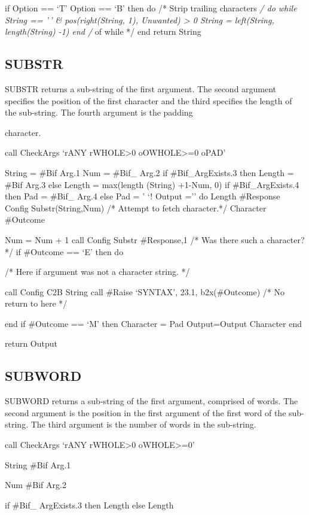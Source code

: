 if Option == `T' \textbar{} Option == `B' then do /* Strip trailing
characters \emph{/ do while String == '\,' \& pos(right(String, 1),
Unwanted) \textgreater{} 0 String = left(String, length(String) -1) end
/} of while */ end return String

\subsection{SUBSTR}\label{substr}

SUBSTR returns a sub-string of the first argument. The second argument
specifies the position of the first character and the third specifies
the length of the sub-string. The fourth argument is the padding

character.

call CheckArgs `rANY rWHOLE\textgreater0 oOWHOLE\textgreater=0 oPAD'

String = \#Bif Arg.1 Num = \#Bif\_ Arg.2 if \#Bif\_ArgExists.3 then
Length = \#Bif Arg.3 else Length = max(length (String) +1-Num, 0) if
\#Bif\_ArgExists.4 then Pad = \#Bif\_ Arg.4 else Pad = ' `! Output =''
do Length \#Response Config Substr(String,Num) /* Attempt to fetch
character.*/ Character \#Outcome

Num = Num + 1 call Config Substr \#Response,1 /* Was there such a
character? */ if \#Outcome == `E' then do

/* Here if argument was not a character string. */

call Config C2B String call \#Raise `SYNTAX', 23.1, b2x(\#Outcome) /* No
return to here */

end if \#Outcome == `M' then Character = Pad Output=Output \textbar{}
\textbar{} Character end

return Output

\subsection{SUBWORD}\label{subword}

SUBWORD returns a sub-string of the first argument, comprised of words.
The second argument is the position in the first argument of the first
word of the sub-string. The third argument is the number of words in the
sub-string.

call CheckArgs `rANY rWHOLE\textgreater0 oWHOLE\textgreater=0'

String \#Bif Arg.1

Num \#Bif Arg.2

if \#Bif\_ ArgExists.3 then Length else Length

